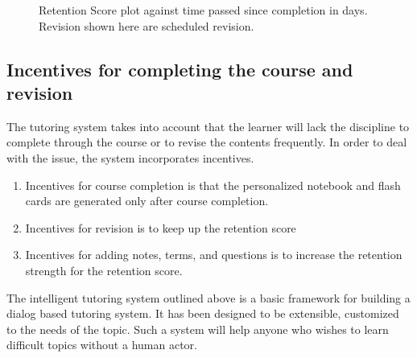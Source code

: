 \documentclass[]{article}
\begin{document}
\begin{figure}[!ht]
    \caption{Retention Score plot against time passed since completion in days. Revision shown here are scheduled revision.}
    \label{fig6}
\end{figure}


\subsection[Incentives]{Incentives for completing the course and revision}

The tutoring system takes into account that the learner will lack the discipline to complete through the course or to revise the contents frequently. In order to deal with the issue, the system incorporates incentives.
\begin{enumerate}
  \item Incentives for course completion is that the personalized notebook and flash cards are generated only after course completion.
  \item Incentives for revision is to keep up the retention score  
  \item Incentives for adding notes, terms, and questions is to increase the retention strength for the retention score.
\end{enumerate}



The intelligent tutoring system outlined above is a basic framework for building a dialog based tutoring system. It has been designed to be extensible, customized to the needs of the topic. Such a system will help anyone who wishes to learn difficult topics without a human actor.
\end{document}
